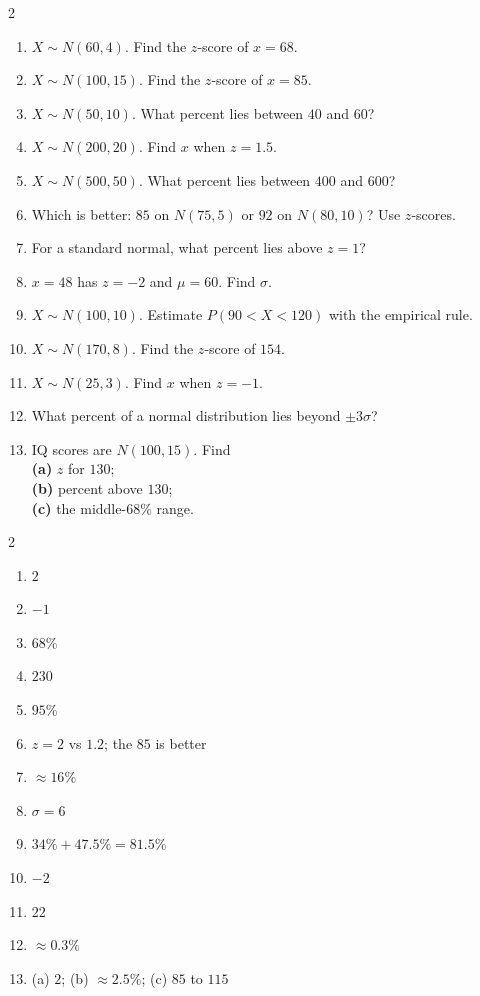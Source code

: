 \documentclass[11pt]{article}
\begin{document}
\clearpage
{}

\begin{recapbox}
\begin{multicols}{2}
\small
\begin{enumerate}[leftmargin=*,itemsep=3pt]
  \item $X\sim N(60,4)$. Find the $z$-score of $x=68$.
  \item $X\sim N(100,15)$. Find the $z$-score of $x=85$.
  \item $X\sim N(50,10)$. What percent lies between $40$ and $60$?
  \item $X\sim N(200,20)$. Find $x$ when $z=1.5$.
  \item $X\sim N(500,50)$. What percent lies between $400$ and $600$?
  \item Which is better: $85$ on $N(75,5)$ or $92$ on $N(80,10)$? Use $z$-scores.
  \item For a standard normal, what percent lies above $z=1$?
  \item $x=48$ has $z=-2$ and $\mu=60$. Find $\sigma$.
  \item $X\sim N(100,10)$. Estimate $P(90<X<120)$ with the empirical rule.
  \item $X\sim N(170,8)$. Find the $z$-score of $154$.
  \item $X\sim N(25,3)$. Find $x$ when $z=-1$.
  \item What percent of a normal distribution lies beyond $\pm3\sigma$?
  \item IQ scores are $N(100,15)$. Find \\ \textbf{(a)} $z$ for $130$; \\ \textbf{(b)} percent above $130$; \\ \textbf{(c)} the middle-$68\%$ range.
\end{enumerate}
\end{multicols}
\end{recapbox}

\begin{keybox}
\begin{multicols}{2}
\small
\begin{enumerate}[leftmargin=*,itemsep=3pt]
  \item $2$
  \item $-1$
  \item $68\%$
  \item $230$
  \item $95\%$
  \item $z=2$ vs $1.2$; the $85$ is better
  \item $\approx16\%$
  \item $\sigma=6$
  \item $34\%+47.5\%=81.5\%$
  \item $-2$
  \item $22$
  \item $\approx0.3\%$
  \item (a) $2$; (b) $\approx2.5\%$; (c) $85$ to $115$
\end{enumerate}
\end{multicols}
\end{keybox}
\end{document}
